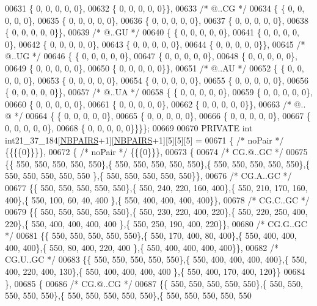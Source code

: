 \begin{DoxyCode}
00631 \{  0, 0, 0, 0, 0\},
00632 \{  0, 0, 0, 0, 0\}\},
00633  \textcolor{comment}{/*  @..CG */}
00634 \{ \{  0, 0, 0, 0, 0\},
00635 \{  0, 0, 0, 0, 0\},
00636 \{  0, 0, 0, 0, 0\},
00637 \{  0, 0, 0, 0, 0\},
00638 \{  0, 0, 0, 0, 0\}\},
00639  \textcolor{comment}{/*  @..GU */}
00640 \{ \{  0, 0, 0, 0, 0\},
00641 \{  0, 0, 0, 0, 0\},
00642 \{  0, 0, 0, 0, 0\},
00643 \{  0, 0, 0, 0, 0\},
00644 \{  0, 0, 0, 0, 0\}\},
00645  \textcolor{comment}{/*  @..UG */}
00646 \{ \{  0, 0, 0, 0, 0\},
00647 \{  0, 0, 0, 0, 0\},
00648 \{  0, 0, 0, 0, 0\},
00649 \{  0, 0, 0, 0, 0\},
00650 \{  0, 0, 0, 0, 0\}\},
00651  \textcolor{comment}{/*  @..AU */}
00652 \{ \{  0, 0, 0, 0, 0\},
00653 \{  0, 0, 0, 0, 0\},
00654 \{  0, 0, 0, 0, 0\},
00655 \{  0, 0, 0, 0, 0\},
00656 \{  0, 0, 0, 0, 0\}\},
00657  \textcolor{comment}{/*  @..UA */}
00658 \{ \{  0, 0, 0, 0, 0\},
00659 \{  0, 0, 0, 0, 0\},
00660 \{  0, 0, 0, 0, 0\},
00661 \{  0, 0, 0, 0, 0\},
00662 \{  0, 0, 0, 0, 0\}\},
00663  \textcolor{comment}{/*  @.. @ */}
00664 \{ \{  0, 0, 0, 0, 0\},
00665 \{  0, 0, 0, 0, 0\},
00666 \{  0, 0, 0, 0, 0\},
00667 \{  0, 0, 0, 0, 0\},
00668 \{  0, 0, 0, 0, 0\}\}\}\};
00669 
00670 PRIVATE \textcolor{keywordtype}{int} int21\_37\_184[\hyperlink{energy__const_8h_a5e75221c779d618eab81e096f37e32ce}{NBPAIRS}+1][\hyperlink{energy__const_8h_a5e75221c779d618eab81e096f37e32ce}{NBPAIRS}+1][5][5][5] =
00671 \{ \textcolor{comment}{/* noPair */} \{\{\{\{0\}\}\}\},
00672 \{ \textcolor{comment}{/* noPair */} \{\{\{0\}\}\},
00673 \{
00674 \textcolor{comment}{/* CG.@..GC */}
00675 \{\{ 550, 550, 550, 550, 550\},\{ 550, 550, 550, 550, 550\},\{ 550, 550, 550, 550, 550\},\{ 550, 550, 550, 550, 550
      \},\{ 550, 550, 550, 550, 550\}\},
00676 \textcolor{comment}{/* CG.A..GC */}
00677 \{\{ 550, 550, 550, 550, 550\},\{ 550, 240, 220, 160, 400\},\{ 550, 210, 170, 160, 400\},\{ 550, 100,  60,  40, 400
      \},\{ 550, 400, 400, 400, 400\}\},
00678 \textcolor{comment}{/* CG.C..GC */}
00679 \{\{ 550, 550, 550, 550, 550\},\{ 550, 230, 220, 400, 220\},\{ 550, 220, 250, 400, 220\},\{ 550, 400, 400, 400, 400
      \},\{ 550, 250, 190, 400, 220\}\},
00680 \textcolor{comment}{/* CG.G..GC */}
00681 \{\{ 550, 550, 550, 550, 550\},\{ 550, 170, 400,  80, 400\},\{ 550, 400, 400, 400, 400\},\{ 550,  80, 400, 220, 400
      \},\{ 550, 400, 400, 400, 400\}\},
00682 \textcolor{comment}{/* CG.U..GC */}
00683 \{\{ 550, 550, 550, 550, 550\},\{ 550, 400, 400, 400, 400\},\{ 550, 400, 220, 400, 130\},\{ 550, 400, 400, 400, 400
      \},\{ 550, 400, 170, 400, 120\}\}
00684 \},
00685 \{
00686 \textcolor{comment}{/* CG.@..CG */}
00687 \{\{ 550, 550, 550, 550, 550\},\{ 550, 550, 550, 550, 550\},\{ 550, 550, 550, 550, 550\},\{ 550, 550, 550, 550, 550

\end{DoxyCode}

